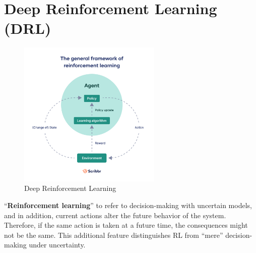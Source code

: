 \chapter{Deep Reinforcement Learning (DRL)}\label{Deep Reinforcement Learning (DRL)}

\begin{table}[H]
    \begin{minipage}{0.45\linewidth}
        \begin{figure}[H]
            \centering
            \includegraphics[height=7cm]{Pictures/deep-reinforcement-learning/drl-flow.jpg}
            \caption{Deep Reinforcement Learning}
        \end{figure}        
    \end{minipage}
    \hfill
    \begin{minipage}{0.45\linewidth}
        “\textbf{Reinforcement learning}” to refer to decision-making with uncertain models, and in addition, current actions alter the future behavior of the system. Therefore, if the same action is taken at a future time, the consequences might not be the same. This additional feature distinguishes RL from “mere” decision-making under uncertainty.\cite{arxiv-2304.00803}
    \end{minipage}
\end{table}


